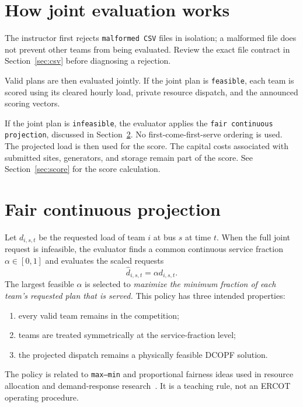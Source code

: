 \documentclass[12pt]{article}
\newcommand{\code}[1]{\texttt{#1}}
\begin{document}
\section{How joint evaluation works}

The instructor first rejects \code{malformed CSV} files in isolation; a malformed file
does not prevent other teams from being evaluated. Review the exact file
contract in Section~\ref{sec:csv} before diagnosing a rejection.

Valid plans are then evaluated jointly. If the joint plan is \code{feasible}, each
team is scored using its cleared hourly load, private resource dispatch, and
the announced scoring vectors.

If the joint plan is \code{infeasible}, the evaluator applies the \code{fair
continuous projection}, discussed in Section~\ref{sec:projection}. No first-come-first-serve ordering is used. The projected
load is then used for the score. The capital costs associated with submitted
sites, generators, and storage remain part of the score. See Section~\ref{sec:score} for the score calculation.

\section{Fair continuous projection}\label{sec:projection}

Let $d_{i,s,t}$ be the requested load of team $i$ at bus $s$ at time $t$. When the full joint request is
infeasible, the evaluator finds a common continuous service fraction
$\alpha\in[0,1]$ and evaluates the scaled requests
\[
  \widehat d_{i,s,t}=\alpha d_{i,s,t}.
\]
The largest feasible $\alpha$ is selected to \emph{maximize the minimum fraction of
each team's requested plan that is served.} This policy has three intended properties:
\begin{enumerate}[leftmargin=*]
  \item every valid team remains in the competition;
  \item teams are treated symmetrically at the service-fraction level;
  \item the projected dispatch remains a physically feasible DCOPF solution.
\end{enumerate}

The policy is related to \code{max--min} and proportional fairness ideas used in
resource allocation and demand-response research~\cite{kelly1998charging,
jacubowicz2022fairness,gebbran2021fairder}. It is a teaching rule, not an
ERCOT operating procedure.
\end{document}
